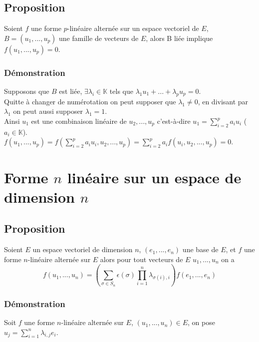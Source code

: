 \documentclass[a4paper,10pt]{book} %
\newcommand{\K}{\mathbb{K}}
\newcommand{\ev}{espace vectoriel }
\begin{document}
\subsection{Proposition}
Soient $f$ une forme $p$-linéaire alternée sur un \ev de $E$, $B=(u_1,...,u_p)$ une famille de vecteurs de $E$, alors B liée implique $f(u_1,...,u_p)=0$.

\subsubsection{Démonstration}
Supposons que $B$ est liée, $\exists \lambda_i \in \K$ tels que $\lambda_1u_1+...+\lambda_pu_p=0$.\\

Quitte à changer de numérotation on peut supposer que $\lambda_1\neq 0$, en divisant par $\lambda_1$ on peut aussi supposer $\lambda_1=1$.\\

Ainsi $u_1$ est une combinaison linéaire de $u_2,...,u_p$ c'est-à-dire $u_1=\sum\limits_{i=2}^p a_iu_i$ ($a_i\in \K$).\\
$f(u_1,...,u_p)=f(\sum\limits_{i=2}^p a_iu_i,u_2,...,u_p)=\sum\limits_{i=2}^p a_if(u_i,u_2,...,u_p)=0$.

\section{Forme $n$ linéaire sur un espace de dimension $n$}
\subsection{Proposition}
Soient $E$ un \ev de dimension $n$, $(e_1,...,e_n)$ une base de $E$, et $f$ une forme $n$-linéaire alternée sur $E$ alors pour tout vecteurs de $E$  $u_1,...,u_n$ on a 
$$f(u_1,...,u_n)=(\sum_{\sigma\in S_n}\epsilon(\sigma)\prod_{i=1}^n\lambda_{\sigma(i),i})f(e_1,...,e_n)$$

\subsubsection{Démonstration}
Soit $f$ une forme $n$-linéaire alternée sur $E$, $(u_1,...,u_n)\in E$, on pose $u_j=\sum\limits_{i=1}^n\lambda_{i,j}e_i$.\\
\end{document}
